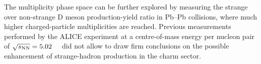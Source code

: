 
\begin{sloppypar}
The multiplicity phase space can be further explored by measuring the strange over non-strange D meson production-yield ratio in Pb--Pb collisions, where much higher charged-particle multiplicities are reached. Previous measurements performed by the ALICE experiment at a centre-of-mass energy per nucleon pair of \mbox{$\sqrt{s_\mathrm{NN}}=5.02$~\tev~\cite{ALICE:2021kfc}} did not allow to draw firm conclusions on the possible enhancement of strange-hadron production in the charm sector. %
\end{sloppypar}


